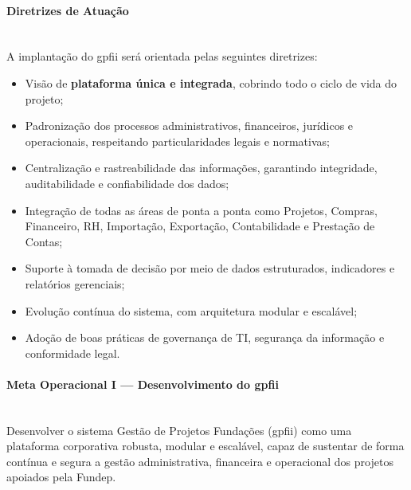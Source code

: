 \documentclass[12pt,a4paper]{article}
\begin{document}
\paragraph{Diretrizes de Atuação}\mbox{}\\
A implantação do \gls{gpfii} será orientada pelas seguintes diretrizes:
\begin{itemize}
  \item Visão de \textbf{plataforma única e integrada}, cobrindo todo o ciclo de vida do projeto;
  \item Padronização dos processos administrativos, financeiros, jurídicos e operacionais, respeitando particularidades legais e normativas;
  \item Centralização e rastreabilidade das informações, garantindo integridade, auditabilidade e confiabilidade dos dados;
  \item Integração de todas as áreas de ponta a ponta como Projetos, Compras, Financeiro, RH, Importação, Exportação, Contabilidade e Prestação de Contas;
  \item Suporte à tomada de decisão por meio de dados estruturados, indicadores e relatórios gerenciais;
  \item Evolução contínua do sistema, com arquitetura modular e escalável;
  \item Adoção de boas práticas de governança de TI, segurança da informação e conformidade legal.
\end{itemize}

\paragraph{Meta Operacional I — Desenvolvimento do \gls{gpfii}}\mbox{}\\
Desenvolver o sistema Gestão de Projetos Fundações (\gls{gpfii}) como uma plataforma corporativa robusta, modular e escalável, capaz de sustentar de forma contínua e segura a gestão administrativa, financeira e operacional dos projetos apoiados pela Fundep.
\end{document}
